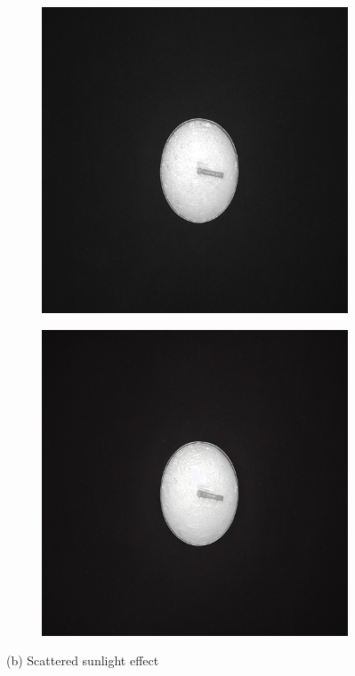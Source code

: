 \documentclass[12pt,DIV14,BCOR12mm,a4paper,footinclude=false,headinclude,parskip=half-,twoside,openright,cleardoublepage=empty,toc=index,bibliography=totoc,listof=totoc]{scrreprt}
\numberwithin{equation}{chapter}
\begin{document}
\begin{figure}
    \begin{subfigure}[t]{0.45\textwidth}
        \centering
        \includegraphics[width=\textwidth]{../media/diff_candles_sunlight_real.png}
    \end{subfigure}%
    \hspace{0.02\textwidth}%
    \begin{subfigure}[t]{0.45\textwidth}
        \centering
        \includegraphics[width=\textwidth]{../media/diff_candles_sunlight_fake.png}
    \end{subfigure}
    \caption*{(b) Scattered sunlight effect}


\end{figure}
\end{document}
